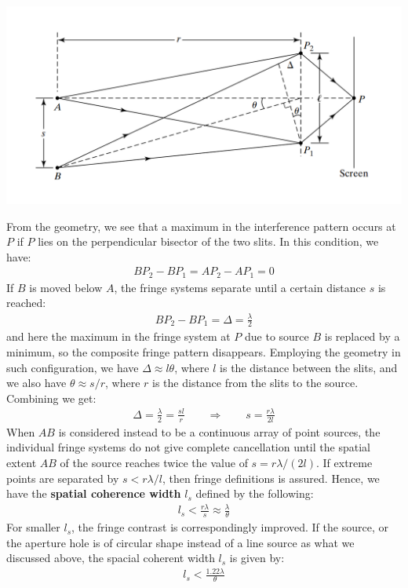 \documentclass[11pt]{book}
\theoremstyle{break}
\theoremstyle{break}
\begin{document}
\begin{center}
\includegraphics[scale=0.6]{spatialCoh}
\end{center}
From the geometry, we see that a maximum in the interference pattern occurs at $P$ if $P$ lies on the perpendicular bisector of the two slits. In this condition, we have:
\begin{align*}
BP_2 - BP_1 = AP_2 - AP_1 = 0
\end{align*}
If $B$ is moved below $A$, the fringe systems separate until a certain distance $s$ is reached:
\begin{align*}
BP_2 - BP_1 = \Delta  = \frac{\lambda}{2}
\end{align*}
and here the maximum in the fringe system at $P$ due to source $B$ is replaced by a minimum, so the composite fringe pattern disappears. Employing the geometry in such configuration, we have $\Delta \approx l\theta$, where $l$ is the distance between the slits, and we also have $\theta \approx s/r$, where $r$ is the distance from the slits to the source. Combining we get:
\begin{align*}
\Delta = \frac{\lambda}{2} = \frac{sl}{r} \qquad \Rightarrow \qquad s = \frac{r\lambda}{2l}
\end{align*}
When $AB$ is considered instead to be a continuous array of point sources, the individual fringe systems do not give complete cancellation until the spatial extent $AB$ of the source reaches twice the value of $s = r\lambda/(2l)$. If extreme points are separated by $s< r\lambda/l$, then fringe definitions is assured. Hence, we have the \textbf{spatial coherence width} $l_s$ defined by the following:
\begin{align*}
l_s < \frac{r\lambda}{s} \approx \frac{\lambda}{\theta}
\end{align*}
For smaller $l_s$, the fringe contrast is correspondingly improved. If the source, or the aperture hole is of circular shape instead of a line source as what we discussed above, the spacial coherent width $l_s$ is given by:
\begin{align*}
l_s < \frac{1.22 \lambda}{\theta}
\end{align*} 
\end{document}
